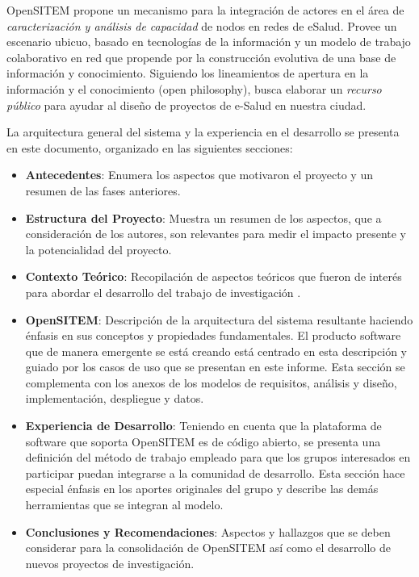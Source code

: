 OpenSITEM propone un mecanismo para la integración de actores en el área de \textit{caracterización y análisis de capacidad} de nodos en redes de eSalud. Provee un escenario ubicuo, basado en tecnologías de la información y un modelo de trabajo colaborativo en red que propende por la construcción evolutiva de una base de información y conocimiento. Siguiendo los lineamientos de apertura en la información y el conocimiento (open philosophy), busca elaborar un \textit{recurso público} para ayudar al diseño de proyectos de e-Salud en nuestra ciudad. 

La arquitectura general del sistema y la experiencia en el desarrollo se presenta en este documento, organizado en las siguientes secciones:

\begin{itemize}
 \item \textbf{Antecedentes}: Enumera los aspectos que motivaron el proyecto y un resumen de las fases anteriores.
 \item \textbf{Estructura del Proyecto}: Muestra un resumen de los aspectos, que a consideración de los autores, son relevantes para medir el impacto presente y la potencialidad del proyecto.
 \item \textbf{Contexto Teórico}: Recopilación de aspectos teóricos que fueron de interés para abordar el desarrollo del trabajo de investigación . 
 \item \textbf{OpenSITEM}: Descripción de la arquitectura del sistema resultante haciendo énfasis en sus conceptos y propiedades fundamentales. El producto software que de manera emergente se está creando está centrado en esta descripción y guiado por los casos de uso que se presentan en este informe. Esta sección se complementa con los anexos de los modelos de requisitos, análisis y diseño, implementación, despliegue y datos.
 \item \textbf{Experiencia de Desarrollo}: Teniendo en cuenta que la plataforma de software que soporta OpenSITEM es de código abierto, se presenta una definición del método de trabajo empleado para que los grupos interesados en participar puedan integrarse a la comunidad de desarrollo. Esta sección hace especial énfasis en los aportes originales del grupo y describe las demás herramientas que se integran al modelo.
 \item \textbf{Conclusiones y Recomendaciones}: Aspectos y hallazgos que se deben considerar para la consolidación de OpenSITEM así como el desarrollo de nuevos proyectos de investigación.
\end{itemize}

